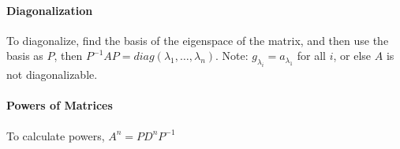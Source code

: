 \documentclass[10pt,letter]{article}
\begin{document}
\paragraph{Diagonalization} To diagonalize, find the basis of the eigenspace of the matrix, and then use the basis as $P$, then $P^{-1}AP=diag(\lambda_1,\ldots,\lambda_n)$. Note: $g_{\lambda_i}=a_{\lambda_1}$ for all $i$, or else $A$ is not diagonalizable. 

\paragraph{Powers of Matrices} To calculate powers, $A^{n}=PD^{n}P^{-1}$
\end{document}

